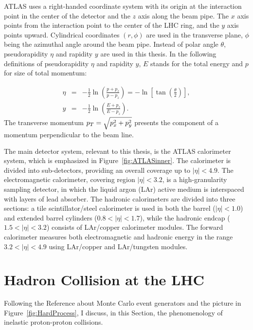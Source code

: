 ATLAS uses a right-handed coordinate system with its origin at the interaction
point in the center of the detector and the $z$ axis along the beam pipe. The
$x$ axis points from the interaction point to the center of the LHC ring, and
the $y$ axis points upward. Cylindrical coordinates $(r, \phi)$ are used in the
transverse plane, $\phi$ being the azimuthal angle around the beam pipe. Instead
of polar angle $\theta$, pseudorapidity $\eta$ and rapidity $y$ are used in this
thesis.  In the following definitions of pseudorapidity $\eta$ and rapidity $y$,
$E$ stands for the total energy and $p$ for size of total momentum: 

\begin{eqnarray}
  \eta &= & - \frac{1}{2} \ln \left( \frac{p+p_z}{p-p_z} \right) = - \ln \left[
  \tan \left( \frac{\theta}{2} \right) \right], \\ y &= &- \frac{1}{2} \ln
  \left( \frac{E+p_z}{E-p_z} \right).	
\end{eqnarray}
The transverse momentum $p_{T} = \sqrt{p_x^2 + p_y^2}$ presents the component of a
momentum perpendicular to the beam line.  

The main detector system, relevant to this thesis, is the ATLAS calorimeter system,
which is emphasized in Figure~\ref{fig:ATLASinner}. The calorimeter is divided
into sub-detectors, providing an overall coverage up to $|\eta| < 4.9$. The
electromagnetic calorimeter, covering region $|\eta| < 3.2$, is a
high-granularity sampling detector, in which the liquid argon (LAr) active medium
is interspaced with layers of lead absorber. The hadronic calorimeters are
divided into three sections: a tile scintillator/steel calorimeter is used in
both the barrel ($|\eta| < 1.0$) and extended barrel cylinders ($0.8 < |\eta| <
1.7$), while the hadronic endcap ($1.5 < |\eta| < 3.2$) consists of LAr/copper
calorimeter modules. The forward calorimeter measures both electromagnetic and
hadronic energy in the range $3.2 < |\eta| < 4.9$ using LAr/copper and
LAr/tungsten modules. 

\section{Hadron Collision at the LHC}

Following the Reference about Monte Carlo event generators \cite{PDG} and the
picture in Figure~\ref{fig:HardProcess}, I discuss, in this Section, the
phenomenology of inelastic proton-proton collisions. 

